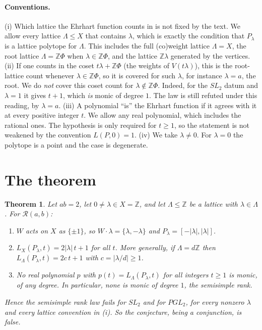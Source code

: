 \documentclass[11pt]{article}
\newtheorem{theorem}{Theorem}
\theoremstyle{remark}
\theoremstyle{definition}
\begin{document}
\paragraph{Conventions.}
(i) Which lattice the Ehrhart function counts in is not fixed by the text. We allow every lattice
$\Lambda\le X$ that contains $\lambda$, which is exactly the condition that $P_\lambda$ is a lattice
polytope for $\Lambda$. This includes the full (co)weight lattice $\Lambda = X$, the root lattice
$\Lambda = \mathbb{Z}\Phi$ when $\lambda\in\mathbb{Z}\Phi$, and the lattice $\mathbb{Z}\lambda$
generated by the vertices.
(ii) If one counts in the coset $t\lambda + \mathbb{Z}\Phi$ (the weights of $V(t\lambda)$), this is
the root-lattice count whenever $\lambda\in\mathbb{Z}\Phi$, so it is covered for such $\lambda$, for
instance $\lambda = a$, the root. We do \emph{not} cover this coset count for
$\lambda\notin\mathbb{Z}\Phi$. Indeed, for the $SL_2$ datum and $\lambda = 1$ it gives $t+1$, which
\emph{is} monic of degree $1$. The law is still refuted under this reading, by $\lambda = a$.
(iii) A polynomial ``is'' the Ehrhart function if it agrees with it at every positive integer $t$. We
allow any real polynomial, which includes the rational ones. The hypothesis is only required for
$t\ge 1$, so the statement is not weakened by the convention $L(P,0) = 1$.
(iv) We take $\lambda\ne 0$. For $\lambda = 0$ the polytope is a point and the case is degenerate.

\section{The theorem}

\begin{theorem}\label{thm:main}
Let $ab = 2$, let $0\ne\lambda\in X = \mathbb{Z}$, and let $\Lambda\le\mathbb{Z}$ be a lattice with
$\lambda\in\Lambda$. For $\mathcal{R}(a,b)$:
\begin{enumerate}
\item $W$ acts on $X$ as $\{\pm 1\}$, so $W\cdot\lambda = \{\lambda,-\lambda\}$ and
$P_\lambda = [-|\lambda|,|\lambda|]$.
\item $L_X(P_\lambda,t) = 2|\lambda|\,t + 1$ for all $t$. More generally, if $\Lambda = d\mathbb{Z}$
then $L_\Lambda(P_\lambda,t) = 2c\,t+1$ with $c = |\lambda/d|\ge 1$.
\item No real polynomial $p$ with $p(t) = L_\Lambda(P_\lambda,t)$ for all integers $t\ge 1$ is monic,
of any degree. In particular, none is monic of degree $1$, the semisimple rank.
\end{enumerate}
Hence the semisimple rank law fails for $SL_2$ and for $PGL_2$, for every nonzero $\lambda$ and every
lattice convention in (i). So the conjecture, being a conjunction, is false.
\end{theorem}
\end{document}
